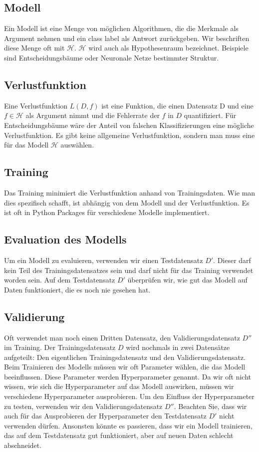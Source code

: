 \subsection{Modell}
Ein Modell ist eine Menge von möglichen Algorithmen, die die Merkmale als Argument nehmen 
und ein class label als Antwort zurückgeben. Wir beschriften diese Menge oft 
mit $\mathcal{H}$. $\mathcal{H}$ wird auch als Hypothesenraum bezeichnet. 
Beispiele sind Entscheidungsbäume oder Neuronale Netze bestimmter Struktur. 

\subsection{Verlustfunktion}
Eine Verlustfunktion $L(D,f)$ ist eine Funktion, die einen Datensatz D und eine $f \in \mathcal{H}$ als Argument nimmt und die Fehlerrate der $f$ in $D$ quantifiziert. 
Für Entscheidungsbäume wäre der Anteil von falschen Klassifizierungen eine mögliche Verlustfunktion. Es gibt keine allgemeine Verlustfunktion, sondern man muss eine für das Modell $\mathcal{H}$ auswählen.

\subsection{Training}
Das Training minimiert die Verlustfunktion anhand von Trainingsdaten. Wie man dies spezifisch schafft, ist abhängig von dem Modell und der Verlustfunktion. Es ist oft in Python Packages für verschiedene Modelle implementiert.

\subsection{Evaluation des Modells}
Um ein Modell zu evaluieren, verwenden wir einen Testdatensatz $D'$. Dieser darf kein Teil des Trainingsdatensatzes sein 
und darf nicht für das Training verwendet worden sein. Auf dem Testdatensatz $D'$
überprüfen wir, wie gut das Modell auf Daten funktioniert, die es noch nie gesehen hat. 

\subsection{Validierung}
Oft verwendet man noch einen Dritten Datensatz, den Validierungsdatensatz $D''$ im Training.
Der Trainingsdatensatz $D$ wird nochmals in zwei Datensätze aufgeteilt: Den eigentlichen Trainingsdatensatz und 
den Validierungsdatensatz. Beim Trainieren des Modells müssen wir oft Parameter wählen, die das Modell beeinflussen.
Diese Parameter werden Hyperparameter genannt. Da wir oft nicht wissen, wie sich die Hyperparameter auf das Modell auswirken,
müssen wir verschiedene Hyperparameter ausprobieren. Um den Einfluss der Hyperparameter zu testen, verwenden wir den Validierungsdatensatz $D''$. Beachten Sie, dass wir auch für das Ausprobieren der Hyperparameter den Testdatensatz $D'$ nicht verwenden dürfen. Ansonsten könnte es passieren, dass wir ein Modell trainieren, das auf dem Testdatensatz gut funktioniert, aber auf neuen Daten schlecht abschneidet. 


